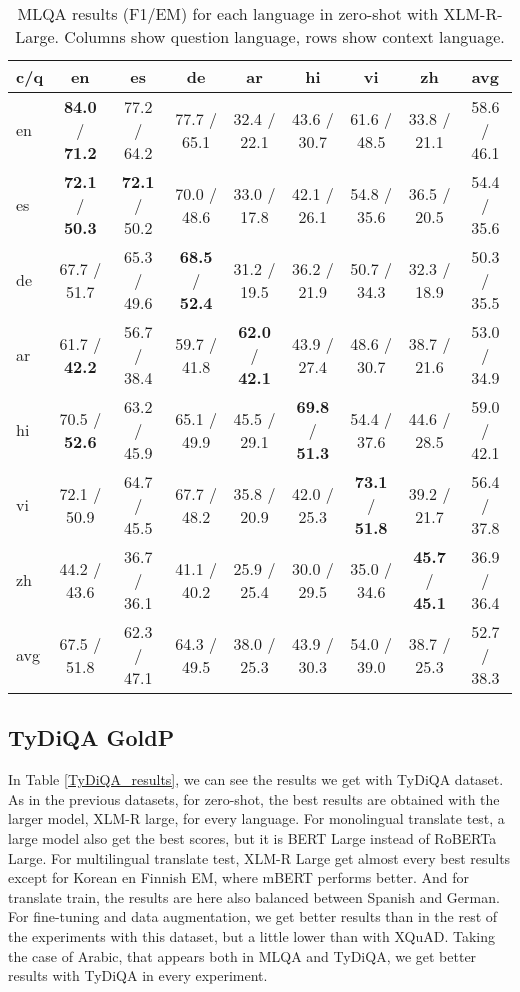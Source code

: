 \documentclass[11pt]{article}
\begin{document}
\begin{table*}[ht]
    \centering
    \begin{adjustbox}{max width=\textwidth}
    \begin{tabular}{l|ccccccc|c}
    \toprule
        c/q & en & es & de & ar & hi & vi & zh & avg \\ \midrule
        en & \textbf{84.0} / \textbf{71.2} & 77.2 / 64.2 & 77.7 / 65.1 & 32.4 / 22.1 & 43.6 / 30.7 & 61.6 / 48.5 & 33.8 / 21.1 & 58.6 / 46.1 \\ 
        es & \textbf{72.1} / \textbf{50.3} & \textbf{72.1} / 50.2 & 70.0 / 48.6 & 33.0 / 17.8 & 42.1 / 26.1 & 54.8 / 35.6 & 36.5 / 20.5 & 54.4 / 35.6 \\ 
        de & 67.7 / 51.7 & 65.3 / 49.6 & \textbf{68.5} / \textbf{52.4} & 31.2 / 19.5 & 36.2 / 21.9 & 50.7 / 34.3 & 32.3 / 18.9 & 50.3 / 35.5 \\ 
        ar & 61.7 / \textbf{42.2} & 56.7 / 38.4 & 59.7 / 41.8 & \textbf{62.0} / \textbf{42.1} & 43.9 / 27.4 & 48.6 / 30.7 & 38.7 / 21.6 & 53.0 / 34.9 \\ 
        hi & 70.5 / \textbf{52.6} & 63.2 / 45.9 & 65.1 / 49.9 & 45.5 / 29.1 & \textbf{69.8} / \textbf{51.3} & 54.4 / 37.6 & 44.6 / 28.5 & 59.0 / 42.1 \\ 
        vi & 72.1 / 50.9 & 64.7 / 45.5 & 67.7 / 48.2 & 35.8 / 20.9 & 42.0 / 25.3 & \textbf{73.1} / \textbf{51.8} & 39.2 / 21.7 & 56.4 / 37.8 \\ 
        zh & 44.2 / 43.6 & 36.7 / 36.1 & 41.1 / 40.2 & 25.9 / 25.4 & 30.0 / 29.5 & 35.0 / 34.6 & \textbf{45.7} / \textbf{45.1} & 36.9 / 36.4 \\ \midrule
        avg & 67.5 / 51.8 & 62.3 / 47.1 & 64.3 / 49.5 & 38.0 / 25.3 & 43.9 / 30.3 & 54.0 / 39.0 & 38.7 / 25.3 & 52.7 / 38.3 \\ \bottomrule
    \end{tabular}
    \end{adjustbox}
    \caption{MLQA results (F1/EM) for each language in zero-shot with XLM-R-Large. Columns show question language, rows show context language.}
    \label{MLQA_results_ZS_XLM-R-Large}
\end{table*}

\subsection{TyDiQA GoldP}

In Table \ref{TyDiQA_results}, we can see the results we get with TyDiQA dataset. As in the previous datasets, for zero-shot, the best results are obtained with the larger model, XLM-R large, for every language. For monolingual translate test, a large model also get the best scores, but it is BERT Large instead of RoBERTa Large. For multilingual translate test, XLM-R Large get almost every best results except for Korean en Finnish EM, where mBERT performs better. And for translate train, the results are here also balanced between Spanish and German. For fine-tuning and data augmentation, we get better results than in the rest of the experiments with this dataset, but a little lower than with XQuAD. Taking the case of Arabic, that appears both in MLQA and TyDiQA, we get better results with TyDiQA in every experiment.
\end{document}
